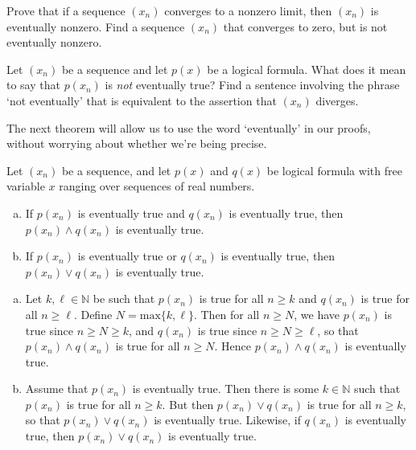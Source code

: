 \begin{exercise}
Prove that if a sequence $(x_n)$ converges to a nonzero limit, then $(x_n)$ is eventually nonzero. Find a sequence $(x_n)$ that converges to zero, but is not eventually nonzero.
\end{exercise}

\begin{exercise}
Let $(x_n)$ be a sequence and let $p(x)$ be a logical formula. What does it mean to say that $p(x_n)$ is \textit{not} eventually true? Find a sentence involving the phrase `not eventually' that is equivalent to the assertion that $(x_n)$ diverges.
\end{exercise}

The next theorem will allow us to use the word `eventually' in our proofs, without worrying about whether we're being precise.

\begin{theorem}
Let $(x_n)$ be a sequence, and let $p(x)$ and $q(x)$ be logical formula with free variable $x$ ranging over sequences of real numbers.
\begin{enumerate}[(a)]
\item If $p(x_n)$ is eventually true and $q(x_n)$ is eventually true, then $p(x_n) \wedge q(x_n)$ is eventually true.
\item If $p(x_n)$ is eventually true or $q(x_n)$ is eventually true, then $p(x_n) \vee q(x_n)$ is eventually true.
\end{enumerate}
\end{theorem}

\begin{cproof}
\fixlistskip
\begin{enumerate}[(a)]
\item Let $k,\ell \in \mathbb{N}$ be such that $p(x_n)$ is true for all $n \ge k$ and $q(x_n)$ is true for all $n \ge \ell$. Define $N = \mathrm{max} \{ k, \ell \}$. Then for all $n \ge N$, we have $p(x_n)$ is true since $n \ge N \ge k$, and $q(x_n)$ is true since $n \ge N \ge \ell$, so that $p(x_n) \wedge q(x_n)$ is true for all $n \ge N$. Hence $p(x_n) \wedge q(x_n)$ is eventually true.

\item Assume that $p(x_n)$ is eventually true. Then there is some $k \in \mathbb{N}$ such that $p(x_n)$ is true for all $n \ge k$. But then $p(x_n) \vee q(x_n)$ is true for all $n \ge k$, so that $p(x_n) \vee q(x_n)$ is eventually true. Likewise, if $q(x_n)$ is eventually true, then $p(x_n) \vee q(x_n)$ is eventually true.
\end{enumerate}
\end{cproof}


